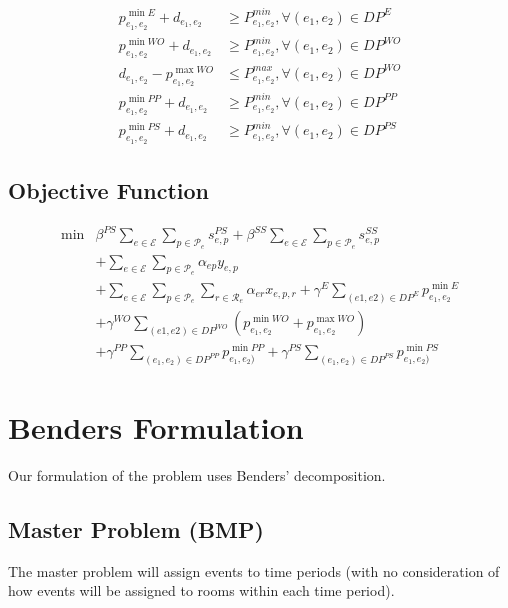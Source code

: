 \documentclass{article}
\newcommand{\scriptP}{\mathcal{P}}
\newcommand{\scriptR}{\mathcal{R}}
\newcommand{\scriptE}{\mathcal{E}}
\begin{document}
\begin{align}
    p^{\min E}_{e_1, e_2} + d_{e_1, e_2} &\ge P^{min}_{e_1, e_2}, \forall (e_1, e_2)\in DP^{E} \\
    p^{\min WO}_{e_1, e_2} + d_{e_1, e_2} &\ge P^{min}_{e_1, e_2}, \forall (e_1, e_2)\in DP^{WO} \\
    d_{e_1, e_2} - p^{\max WO}_{e_1, e_2} &\le P^{max}_{e_1, e_2}, \forall (e_1, e_2)\in DP^{WO} \\
    p^{\min PP}_{e_1, e_2} + d_{e_1, e_2} &\ge P^{min}_{e_1, e_2}, \forall (e_1, e_2)\in DP^{PP} \\
    p^{\min PS}_{e_1, e_2} + d_{e_1, e_2} &\ge P^{min}_{e_1, e_2}, \forall (e_1, e_2)\in DP^{PS}
\end{align}

\bigbreak

\subsection{Objective Function}

\begin{align} 
    \min &\beta^{PS}\sum_{e\in \scriptE}\sum_{p\in\scriptP_e}s^{PS}_{e,p} + \beta^{SS}\sum_{e\in\scriptE}\sum_{p\in\scriptP_e}s^{SS}_{e,p} \nonumber \\
    &+\sum_{e\in\scriptE}\sum_{p\in\scriptP_e}\alpha_{ep}y_{e,p} \nonumber \\
    &+\sum_{e\in\scriptE}\sum_{p\in\scriptP_e}\sum_{r\in\scriptR_e}\alpha_{er}x_{e,p,r}
    + \gamma^E\sum_{(e1, e2)\in DP^{E}} p^{\min E}_{e_1, e_2} \nonumber \\
    &+ \gamma^{WO} \sum_{(e1, e2)\in DP^{WO}}\left(p^{\min WO}_{e_1, e_2} + p^{\max WO}_{e_1, e_2}\right) \nonumber \\
    &+ \gamma^{PP}\sum_{(e_1, e_2)\in DP^{PP}} p^{\min PP}_{e_1, e_2)}
    + \gamma^{PS}\sum_{(e_1, e_2)\in DP^{PS}} p^{\min PS}_{e_1, e_2)}
\end{align}

\newpage

\section{Benders Formulation}\label{benders_formulation}
Our formulation of the problem uses Benders' decomposition.

\subsection{Master Problem (BMP)}
The master problem will assign events to time periods (with no consideration of
how events will be assigned to rooms within each time period).
\end{document}
